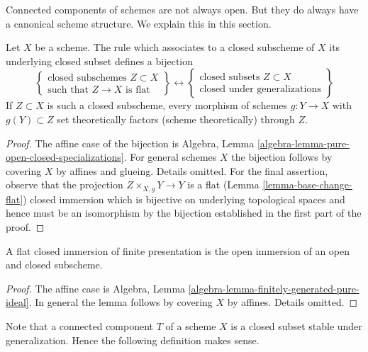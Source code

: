 \noindent
Connected components of schemes are not always open. But they do always
have a canonical scheme structure. We explain this in this section.

\begin{lemma}
\label{lemma-characterize-flat-closed-immersions}
Let $X$ be a scheme. The rule which associates to a closed subscheme
of $X$ its underlying closed subset defines a bijection
$$
\left\{
\begin{matrix}
\text{closed subschemes }Z \subset X \\
\text{such that }Z \to X\text{ is flat}
\end{matrix}
\right\}
\leftrightarrow
\left\{
\begin{matrix}
\text{closed subsets }Z \subset X \\
\text{closed under generalizations}
\end{matrix}
\right\}
$$
If $Z \subset X$ is such a closed subscheme, every morphism of schemes
$g : Y \to X$ with $g(Y) \subset Z$ set theoretically factors (scheme
theoretically) through $Z$.
\end{lemma}

\begin{proof}
The affine case of the bijection is
Algebra, Lemma \ref{algebra-lemma-pure-open-closed-specializations}.
For general schemes $X$ the bijection follows by covering $X$ by affines
and glueing. Details omitted. For the final assertion, observe that the
projection $Z \times_{X, g} Y \to Y$ is a flat
(Lemma \ref{lemma-base-change-flat}) closed immersion which
is bijective on underlying topological spaces and hence must be
an isomorphism by the bijection established in the first part of the proof.
\end{proof}

\begin{lemma}
\label{lemma-flat-closed-immersions-finite-presentation}
A flat closed immersion of finite presentation
is the open immersion of an open and closed subscheme.
\end{lemma}

\begin{proof}
The affine case is
Algebra, Lemma \ref{algebra-lemma-finitely-generated-pure-ideal}.
In general the lemma follows by covering $X$ by affines.
Details omitted.
\end{proof}

\noindent
Note that a connected component $T$ of a scheme $X$ is a closed
subset stable under generalization. Hence the following definition
makes sense.

